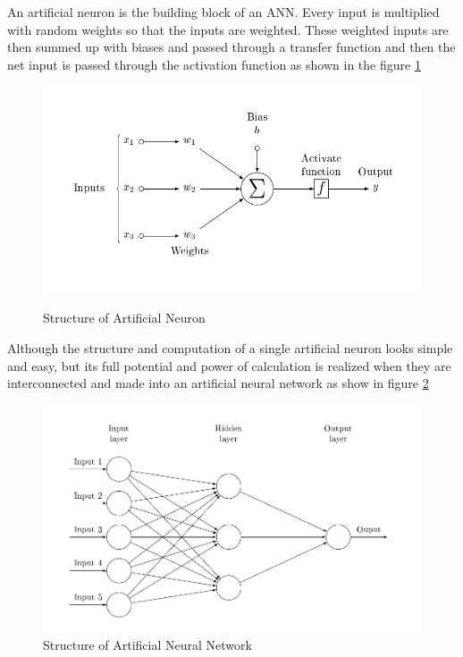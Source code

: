 \documentclass[12pt, a4paper]{report}
\begin{document}
An artificial neuron is the building block of an ANN. Every input is multiplied with random weights so that the inputs are weighted. These weighted inputs are then summed up with biases and passed through a transfer function and then the net input is passed through the activation function as shown in the figure \ref{fig:AN} \\ \par
\begin{figure}[h]
\centering	
\includegraphics[width=12cm]{ArtificialNeuronModel.png}\\
\caption{Structure of Artificial Neuron}
\label{fig:AN}
\end{figure} 	

Although the structure and computation of a single artificial neuron looks simple and easy, but its full potential and power of calculation is realized when they are interconnected and made into an artificial neural network as show in figure \ref{fig:NN}\\ \par
\begin{figure}[h]
\centering
\includegraphics[width=12cm]{neural_network.png}
\caption{Structure of Artificial Neural Network}
\label{fig:NN}
\end{figure}
\end{document}
